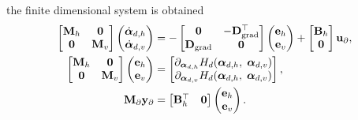 the finite dimensional system is obtained
\begin{equation}\label{eq:pHsys_findim_shwater}
\begin{aligned}
\begin{bmatrix}
\mathbf{M}_h & \mathbf{0} \\
\mathbf{0} & \mathbf{M}_v \\
\end{bmatrix}
\begin{pmatrix}
\dot{\bm{\alpha}}_{d, h} \\
\dot{\bm{\alpha}}_{d, v} \\
\end{pmatrix}
&= -\begin{bmatrix}
\mathbf{0} &  - \mathbf{D}_{\operatorname*{grad}}^\top \\
\mathbf{D}_{\operatorname*{grad}} & \mathbf{0} \\
\end{bmatrix} 
\begin{pmatrix}
\mathbf{e}_{h} \\
\mathbf{e}_{v} \\
\end{pmatrix} + 
\begin{bmatrix}
\mathbf{B}_h \\
\mathbf{0}\\
\end{bmatrix}
\mathbf{u}_\partial, \\
\begin{bmatrix}
\mathbf{M}_h & \mathbf{0} \\
\mathbf{0} & \mathbf{M}_v \\
\end{bmatrix}
\begin{pmatrix}
\mathbf{e}_{h} \\
\mathbf{e}_{v} \\
\end{pmatrix}
&= \begin{bmatrix}
\partial_{\bm{\alpha}_{d, h}} H_d(\bm{\alpha}_{d, h},\; \bm{\alpha}_{d, v})\\
\partial_{\bm{\alpha}_{d, v}} H_d(\bm{\alpha}_{d, h},\; \bm{\alpha}_{d, v})\\
\end{bmatrix}, \\
\mathbf{M}_\partial {\mathbf{y}_\partial} &= \begin{bmatrix}
\mathbf{B}_h^\top & \mathbf{0}
\end{bmatrix}\begin{pmatrix}
\mathbf{e}_{h} \\
\mathbf{e}_{v} \\
\end{pmatrix}.
\end{aligned}
\end{equation}
